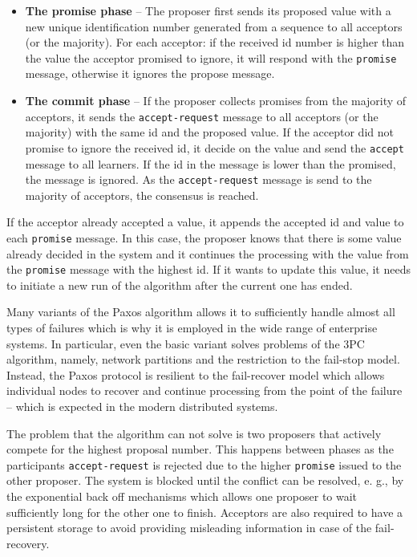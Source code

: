 \documentclass[oneside,
  digital, %
  table,   %
  nolof,     %
  nolot,     %
]{fithesis3}
\begin{document}
\begin{itemize}
    \item \textbf{The promise phase} -- The proposer first sends its proposed value with a new unique identification number generated from a sequence to all acceptors (or the majority). For each acceptor: if the received id number is higher than the value the acceptor promised to ignore, it will respond with the \texttt{promise} message, otherwise it ignores the propose message.
    
    \item \textbf{The commit phase} -- If the proposer collects promises from the majority of acceptors, it sends the \texttt{accept-request} message to all acceptors (or the majority) with the same id and the proposed value. If the acceptor did not promise to ignore the received id, it decide on the value and send the \texttt{accept} message to all learners. If the id in the message is lower than the promised, the message is ignored. As the \texttt{accept-request} message is send to the majority of acceptors, the consensus is reached.
\end{itemize}

If the acceptor already accepted a value, it appends the accepted id and value to each \texttt{promise} message. In this case, the proposer knows that there is some value already decided in the system and it continues the processing with the value from the \texttt{promise} message with the highest id. If it wants to update this value, it needs to initiate a new run of the algorithm after the current one has ended. 

Many variants of the Paxos algorithm allows it to sufficiently handle almost all types of failures which is why it is employed in the wide range of enterprise systems. In particular, even the basic variant solves  problems of the 3PC algorithm, namely, network partitions and the restriction to the fail-stop model. Instead, the Paxos protocol is resilient to the fail-recover model which allows individual nodes to recover and continue processing from the point of the failure -- which is expected in the modern distributed systems.

The problem that the algorithm can not solve is two proposers that actively compete for the highest proposal number. This happens between phases as the participants \texttt{accept-request} is rejected due to the higher \texttt{promise} issued to the other proposer. The system is blocked until the conflict can be resolved, e. g., by the exponential back off mechanisms which allows one proposer to wait sufficiently long for the other one to finish. Acceptors are also required to have a persistent storage to avoid providing misleading information in case of the fail-recovery.
\end{document}
